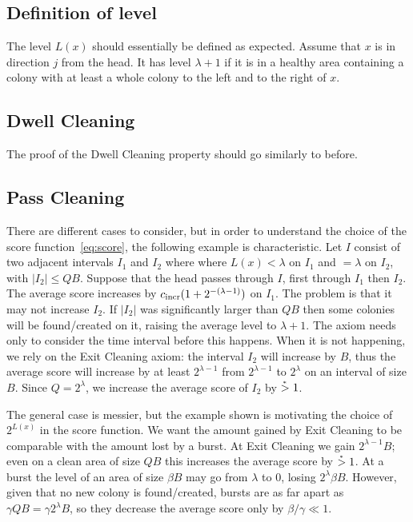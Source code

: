 \documentclass[12pt]{memoir}
\renewcommand{\le}{\leq}
\def\B{B}
\newcommand{\Cns}[2]{#1_{\textrm{\upshape #2}}}
\newcommand{\cns}[1]{\Cns{c}{#1}}
\newcommand{\cIncr}{\cns{incr}}
\begin{document}
\subsection{Definition of level}

The level \( L(x) \) should essentially be defined as expected.
Assume that \( x \) is in direction \( j \) from the head.
It has level \( \lambda+1 \)
if it is in a healthy area containing a colony with at least a whole colony to the left and to the right
of \( x \).


\subsection{Dwell Cleaning}

The proof of the Dwell Cleaning property should go similarly to before.


\subsection{Pass Cleaning}

There are different cases  to consider, but in order to understand the choice of the
score function~\eqref{eq:score}, the following example is characteristic.
Let \( I \) consist of two adjacent intervals \( I_{1} \) and \(  I_{2} \) where  
where \( L(x)<\lambda \) on \( I_{1} \) and \( =\lambda \) on \( I_{2} \), with
\( |I_{2}|\le Q\B \).
Suppose that the head passes through \( I \), first through \( I_{1} \) then \( I_{2} \).
The average score increases by \( \cIncr(1+2^{-(\lambda-1)}) \) on \( I_{1} \).
The problem is that it may not increase \( I_{2} \).
If \( |I_{2}| \) was significantly larger than \( Q\B \) then some colonies will be
found/created on it, raising the average level to \( \lambda+1 \).
The axiom needs only to consider the time interval before this happens.
When it is not happening, we rely on the Exit Cleaning axiom: the interval \( I_{2} \)
will increase by \( \B \), thus the average score will increase by at least \( 2^{\lambda-1} \)
from \( 2^{\lambda-1} \) to \( 2^{\lambda} \) on an interval of size \( \B \).
Since \( Q=2^{\lambda} \), we increase the average score of \( I_{2} \) by \( \stackrel{{}_*}{>} 1 \).

The general case is messier, but the example shown is motivating the choice of \( 2^{L(x)} \) in
the score function.
We want the amount gained by Exit Cleaning to be
comparable with the amount lost by a burst.
At Exit Cleaning we gain \( 2^{\lambda-1}\B \); even on a clean area of size \( Q\B \)
this increases the average score by \( \stackrel{{}_*}{>} 1 \).
At a burst the level of an area of size \( \beta\B \) may go from \( \lambda \) to 0,
losing \( 2^{\lambda}\beta\B \).
However, given that no new colony is found/created, bursts are as far apart as 
\( \gamma Q\B =\gamma 2^{\lambda}\B \), so they decrease the average score 
only by \( \beta/\gamma\ll 1 \).
\end{document}
